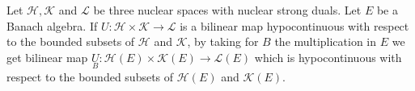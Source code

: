 
Let $\mathscr{H}, \mathscr{K}$ and $\mathscr{L}$ be three nuclear
spaces with nuclear strong duals. Let $E$ be a Banach algebra. If $U :
\mathscr{H} \times \mathscr{K} \to \mathscr{L}$ is a bilinear map
hypocontinuous with respect to the bounded subsets of $\mathscr{H}$
and $\mathscr{K}$, by taking for $B$ the multiplication in $E$ we get
bilinear map $\underset{B}{U} : \mathscr{H}(E) \times \mathscr{K}(E)
\to \mathscr{L}(E)$ which is hypocontinuous with respect to the
bounded subsets of $\mathscr{H}(E)$ and $\mathscr{K}(E)$.  

